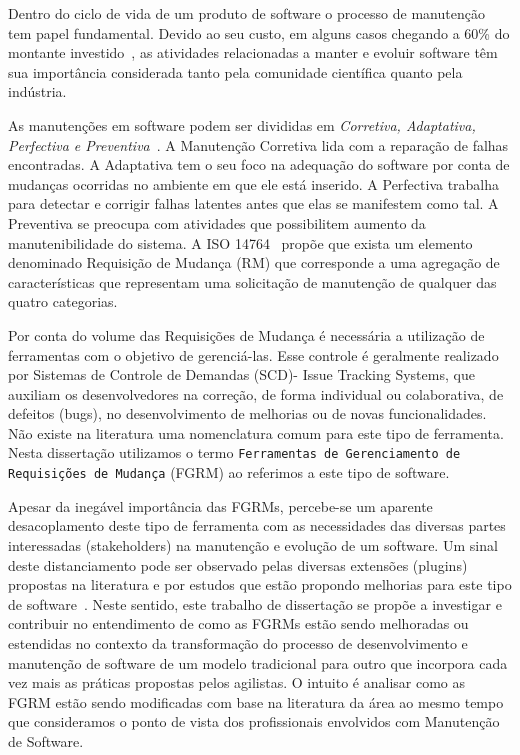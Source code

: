 Dentro do ciclo de vida de um produto de software o processo de manutenção tem
papel fundamental. Devido ao seu custo, em alguns casos chegando a 60\% do
montante investido~\cite{kaur2015review}, as atividades relacionadas a manter e
evoluir software têm sua importância considerada tanto pela comunidade
científica quanto pela indústria.

As manutenções em software podem ser divididas em \textit{Corretiva, Adaptativa,
Perfectiva e Preventiva}~\cite{Lientz:1980:SMM:601062,159342}. A Manutenção
Corretiva lida com a reparação de falhas encontradas. A Adaptativa tem o seu
foco na adequação do software por conta de mudanças ocorridas no ambiente em que
ele está inserido. A Perfectiva trabalha para detectar e corrigir falhas
latentes antes que elas se manifestem como tal. A Preventiva se preocupa com
atividades que possibilitem aumento da manutenibilidade do sistema. A ISO
14764~\cite{1703974} propõe que exista um elemento denominado Requisição de
Mudança (RM) que corresponde a uma agregação de características que representam
uma solicitação de manutenção de qualquer das quatro categorias.

Por conta do volume das Requisições de Mudança é necessária a utilização de
ferramentas com o objetivo de gerenciá-las. Esse controle é geralmente realizado
por Sistemas de Controle de Demandas (SCD)- Issue Tracking Systems, que auxiliam
os desenvolvedores na correção, de forma individual ou colaborativa, de defeitos
(bugs), no desenvolvimento de melhorias ou de novas funcionalidades. Não existe
na literatura uma nomenclatura comum para este tipo de ferramenta. Nesta
dissertação utilizamos o termo \texttt{Ferramentas de Gerenciamento de
Requisições de Mudança} (FGRM) ao referimos a este tipo de software.

Apesar da inegável importância das FGRMs, percebe-se um aparente desacoplamento
deste tipo de ferramenta com as necessidades das diversas partes interessadas
(stakeholders) na manutenção e evolução de um software. Um sinal deste
distanciamento pode ser observado pelas diversas extensões (plugins) propostas
na literatura
\cite{101186,Thung:2014:BIT:2635868.2661678,Kononenko:2014:DED:2591062.2591075}
e por estudos que estão propondo melhorias para este tipo de
software~\cite{zimmermann2010makes, cavalcanti2014challenges,
zimmermann2009improving}. Neste sentido, este trabalho de dissertação se propõe
a investigar e contribuir no entendimento de como as FGRMs estão sendo
melhoradas ou estendidas no contexto da transformação do processo de
desenvolvimento e manutenção de software de um modelo tradicional para outro que
incorpora cada vez mais as práticas propostas pelos agilistas. O intuito é
analisar como as FGRM estão sendo modificadas com base na literatura da área ao
mesmo tempo que consideramos o ponto de vista dos profissionais envolvidos com
Manutenção de Software.

